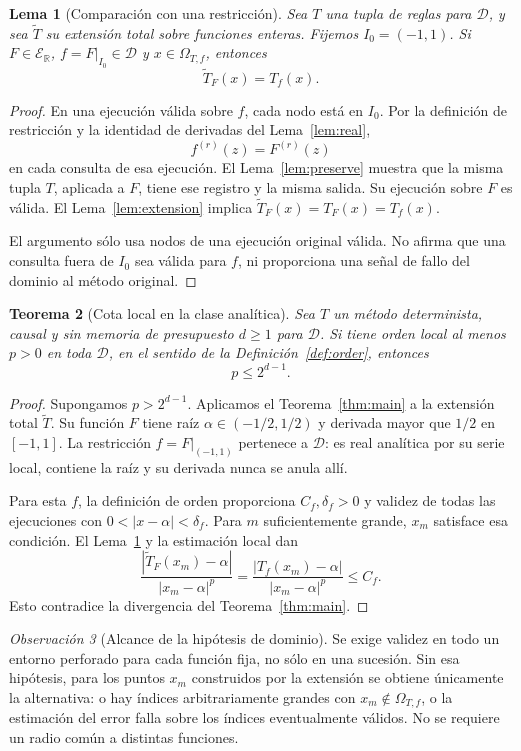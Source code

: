 \documentclass[11pt,a4paper]{article}
\numberwithin{equation}{section}
\newtheorem{theorem}{Teorema}[section]
\newtheorem{lemma}[theorem]{Lema}
\theoremstyle{definition}
\theoremstyle{remark}
\newtheorem{remark}[theorem]{Observación}
\newcommand{\R}{\mathbb R}
\newcommand{\ER}{\mathcal E_{\R}}
\newcommand{\DD}{\mathcal D}
\begin{document}
\begin{lemma}[Comparación con una restricción]\label{lem:restriction}
Sea $T$ una tupla de reglas para $\DD$, y sea $\widetilde T$ su extensión total sobre funciones enteras. Fijemos $I_0=(-1,1)$. Si $F\in\ER$, $f=F|_{I_0}\in\DD$ y $x\in\Omega_{T,f}$, entonces
\[
\widetilde T_F(x)=T_f(x).
\]
\end{lemma}
\begin{proof}
En una ejecución válida sobre $f$, cada nodo está en $I_0$. Por la definición de restricción y la identidad de derivadas del Lema~\ref{lem:real},
\[
f^{(r)}(z)=F^{(r)}(z)
\]
en cada consulta de esa ejecución. El Lema~\ref{lem:preserve} muestra que la misma tupla $T$, aplicada a $F$, tiene ese registro y la misma salida. Su ejecución sobre $F$ es válida. El Lema~\ref{lem:extension} implica $\widetilde T_F(x)=T_F(x)=T_f(x)$.

El argumento sólo usa nodos de una ejecución original válida. No afirma que una consulta fuera de $I_0$ sea válida para $f$, ni proporciona una señal de fallo del dominio al método original.
\end{proof}

\begin{theorem}[Cota local en la clase analítica]\label{thm:analyticbound}
Sea $T$ un método determinista, causal y sin memoria de presupuesto $d\ge1$ para $\DD$. Si tiene orden local al menos $p>0$ en toda $\DD$, en el sentido de la Definición~\ref{def:order}, entonces
\[
p\le2^{d-1}.
\]
\end{theorem}
\begin{proof}
Supongamos $p>2^{d-1}$. Aplicamos el Teorema~\ref{thm:main} a la extensión total $\widetilde T$. Su función $F$ tiene raíz $\alpha\in(-1/2,1/2)$ y derivada mayor que $1/2$ en $[-1,1]$. La restricción $f=F|_{(-1,1)}$ pertenece a $\DD$: es real analítica por su serie local, contiene la raíz y su derivada nunca se anula allí.

Para esta $f$, la definición de orden proporciona $C_f,\delta_f>0$ y validez de todas las ejecuciones con $0<|x-\alpha|<\delta_f$. Para $m$ suficientemente grande, $x_m$ satisface esa condición. El Lema~\ref{lem:restriction} y la estimación local dan
\[
\frac{|\widetilde T_F(x_m)-\alpha|}{|x_m-\alpha|^p}
=\frac{|T_f(x_m)-\alpha|}{|x_m-\alpha|^p}\le C_f.
\]
Esto contradice la divergencia del Teorema~\ref{thm:main}.
\end{proof}

\begin{remark}[Alcance de la hipótesis de dominio]
Se exige validez en todo un entorno perforado para cada función fija, no sólo en una sucesión. Sin esa hipótesis, para los puntos $x_m$ construidos por la extensión se obtiene únicamente la alternativa: o hay índices arbitrariamente grandes con $x_m\notin\Omega_{T,f}$, o la estimación del error falla sobre los índices eventualmente válidos. No se requiere un radio común a distintas funciones.
\end{remark}
\end{document}
